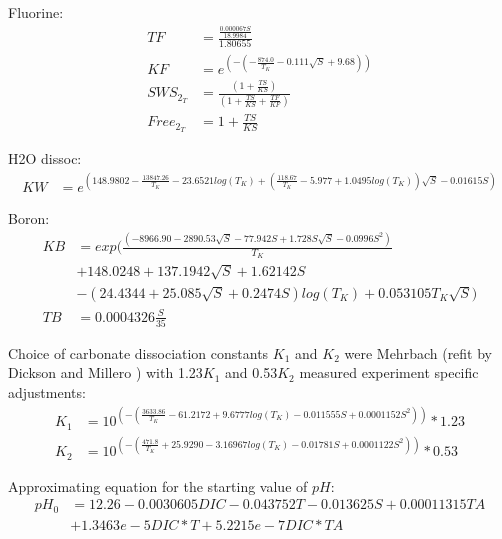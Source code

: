 \documentclass{ruthesis}
\begin{document}
Fluorine:
\begin{align*}
TF       	&= \frac{\frac{0.000067 S}{18.9984}}{1.80655} \nonumber \\
KF       	&= e^{(-(-\frac{874.0}{T_K} - 0.111 \sqrt{S} + 9.68))} \nonumber \\
SWS_{2_T}  	&= \frac{(1 + \frac{TS}{KS})}{(1 + \frac{TS}{KS} + \frac{TF}{KF})} \nonumber \\
Free_{2_T} 	&= 1 + \frac{TS}{KS} \nonumber 
\end{align*}

H2O dissoc:
\begin{align*}
KW 		&= e^{(148.9802 - \frac{13847.26}{T_K}  - 23.6521 log(T_K) 
+ (\frac{118.67}{T_K} - 5.977 + 1.0495 log(T_K)) \sqrt{S} - 0.01615 S)} \nonumber 
\end{align*}

Boron:
\begin{align*}
KB 		&= exp(\frac{(-8966.90 - 2890.53 \sqrt{S} - 77.942 S + 1.728 S \sqrt{S} - 0.0996 S^2)}{T_K} \\
&+ 148.0248 + 137.1942 \sqrt{S} + 1.62142 S \\
&- (24.4344 + 25.085 \sqrt{S} + 0.2474 S) log(T_K) + 0.053105 T_K \sqrt{S}) \nonumber \\
TB 		&= 0.0004326 \frac{S}{35} \nonumber 
\end{align*}

Choice of carbonate dissociation constants $K_1$ and $K_2$ were Mehrbach \cite{mehrbach1973measurement} (refit by Dickson and Millero \cite{dickson1987comparison}) with 1.23$K_1$ and 0.53$K_2$ measured experiment specific adjustments:
\begin{align}
K_1 		&= 10^{(-(\frac{3633.86}{T_K} - 61.2172 + 9.6777 log(T_K) - 0.011555 S + 0.0001152 S^2))}*1.23 \\
K_2 		&= 10^{(-(\frac{471.8}{T_K} + 25.9290 - 3.16967 log(T_K) - 0.01781 S + 0.0001122 S^2))}*0.53 	
\end{align}


Approximating equation for the starting value of $pH$: 
\begin{align}
pH_{0} 	&= 12.26 -0.0030605 DIC -0.043752 T -0.013625 S+ 0.00011315 TA \nonumber \\
&+ 1.3463e-5 DIC*T + 5.2215e-7 DIC*TA  \label{pH_approx_eq}	
\end{align}
\end{document}
